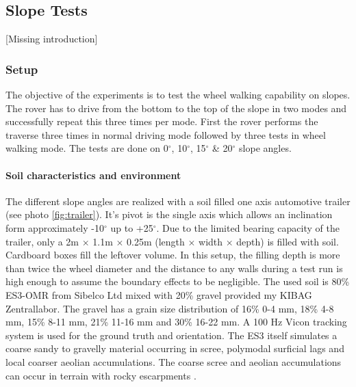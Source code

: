 \documentclass[a4paper,twocolumn]{esapub2005} %
\begin{document}

\subsection{Slope Tests}

[Missing introduction]

\subsubsection{Setup}
The objective of the experiments is to test the wheel walking capability on slopes. The rover has to drive from the bottom to the top of the slope in two modes and successfully repeat this three times per mode. First the rover performs the traverse three times in normal driving mode followed by three tests in wheel walking mode. The tests are done on 0$^{\circ}$, 10$^{\circ}$, 15$^{\circ}$ \& 20$^{\circ}$ slope angles. 

\paragraph{Soil characteristics and environment}
The different slope angles are realized with a soil filled one axis automotive trailer (see photo \ref{fig:trailer}). It's pivot is the single axis which allows an inclination form approximately -10$^{\circ}$ up to +25$^{\circ}$. Due to the limited bearing capacity of the trailer, only a 2m $\times$ 1.1m $\times$ 0.25m (length $\times$ width $\times$ depth) is filled with soil. Cardboard boxes fill the leftover volume. In this setup, the filling depth is more than twice the wheel diameter and the distance to any walls during a test run is high enough to assume  the boundary effects to be negligible. 
The used soil is 80\% ES3-OMR from Sibelco Ltd mixed with 20\% gravel provided my KIBAG Zentrallabor. The gravel has a grain size distribution of 16\% 0-4 mm, 18\% 4-8 mm, 15\% 8-11 mm, 21\% 11-16 mm and 30\% 16-22 mm.
A 100 Hz Vicon tracking system is used for the ground truth and orientation. The ES3 itself simulates a coarse sandy to gravelly material occurring in scree, polymodal surficial lags and local coarser aeolian accumulations. The coarse scree and aeolian accumulations can occur in terrain with rocky escarpments \cite{michaud2014}.
\end{document}
